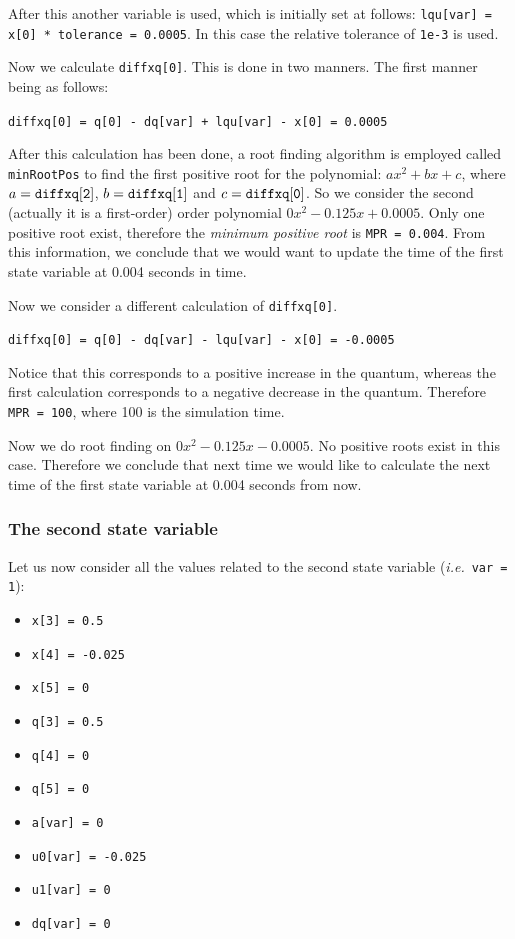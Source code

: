 \documentclass[10pt]{article}
\begin{document}
After this another variable is used, which is initially set at follows: {\tt{lqu[var] = x[0] * tolerance = 0.0005}}. In this case the relative tolerance of {\tt{1e-3}} is used.

Now we calculate {\tt{diffxq[0]}}. This is done in two manners. The first manner being as follows:

{\tt{diffxq[0] = q[0] - dq[var] + lqu[var] - x[0] = 0.0005}}

After this calculation has been done, a root finding algorithm is employed called {\tt{minRootPos}} to find the first positive root for the polynomial: $ax^2 + bx +c$, where $a = {\tt{diffxq[2]}}$, $b = {\tt{diffxq[1]}}$ and $c = {\tt{diffxq[0]}}$. So we consider the second (actually it is a first-order) order polynomial $0x^2 -0.125x + 0.0005$. Only one positive root exist, therefore the {\em minimum positive root}  is {\tt{MPR = 0.004}}. From this information, we conclude that we would want to update the time of the first state variable at 0.004 seconds in time.

Now we consider a different calculation of {\tt{diffxq[0]}}.

{\tt{diffxq[0] = q[0] - dq[var] - lqu[var] - x[0] = -0.0005}}

Notice that this corresponds to a positive increase in the quantum, whereas the first calculation corresponds to a negative decrease in the quantum. Therefore {\tt{MPR = 100}}, where 100 is the simulation time.

Now we do root finding on $0x^2 -0.125x - 0.0005$. No positive roots exist in this case. Therefore we conclude that next time we would like to calculate the next time of the first state variable at 0.004 seconds from now.

\subsubsection{The second state variable}

Let us now consider all the values related to the second state variable ({\em i.e.}\ {\tt{var = 1}}):
\begin{itemize}
 \item {\tt{x[3] = 0.5}}
 \item {\tt{x[4] = -0.025}}
 \item {\tt{x[5] = 0}}
  \item {\tt{q[3] = 0.5}}
 \item {\tt{q[4] = 0}}
 \item {\tt{q[5] = 0}}
  \item {\tt{a[var] = 0}}
  \item {\tt{u0[var] = -0.025}}
 \item {\tt{u1[var] = 0}}
 \item {\tt{dq[var] = 0}}
\end{itemize}
\end{document}

